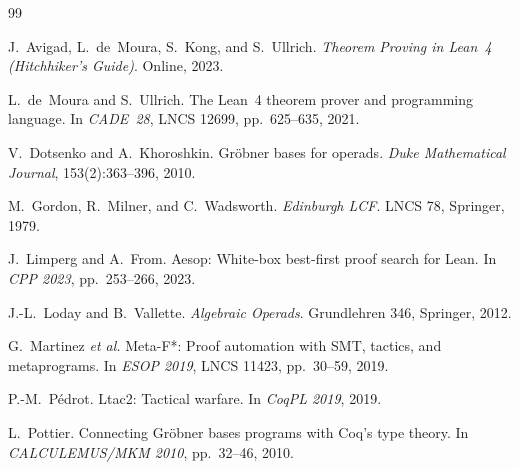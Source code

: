 \documentclass[11pt]{article}
\begin{document}
\begin{thebibliography}{99}

J.~Avigad, L.~de~Moura, S.~Kong, and S.~Ullrich.
\newblock \emph{Theorem Proving in Lean~4 (Hitchhiker's Guide)}.
\newblock Online, 2023.

L.~de~Moura and S.~Ullrich.
\newblock The Lean~4 theorem prover and programming language.
\newblock In \emph{CADE~28}, LNCS 12699, pp.~625--635, 2021.

V.~Dotsenko and A.~Khoroshkin.
\newblock Gr\"obner bases for operads.
\newblock \emph{Duke Mathematical Journal}, 153(2):363--396, 2010.

M.~Gordon, R.~Milner, and C.~Wadsworth.
\newblock \emph{Edinburgh LCF}.
\newblock LNCS 78, Springer, 1979.

J.~Limperg and A.~From.
\newblock Aesop: White-box best-first proof search for Lean.
\newblock In \emph{CPP 2023}, pp.~253--266, 2023.

J.-L.~Loday and B.~Vallette.
\newblock \emph{Algebraic Operads}.
\newblock Grundlehren 346, Springer, 2012.

G.~Martinez \emph{et al.}
\newblock Meta-F*: Proof automation with SMT, tactics, and metaprograms.
\newblock In \emph{ESOP 2019}, LNCS 11423, pp.~30--59, 2019.

P.-M.~P\'edrot.
\newblock Ltac2: Tactical warfare.
\newblock In \emph{CoqPL 2019}, 2019.

L.~Pottier.
\newblock Connecting Gr\"obner bases programs with Coq's type theory.
\newblock In \emph{CALCULEMUS/MKM 2010}, pp.~32--46, 2010.

\end{thebibliography}
\end{document}
